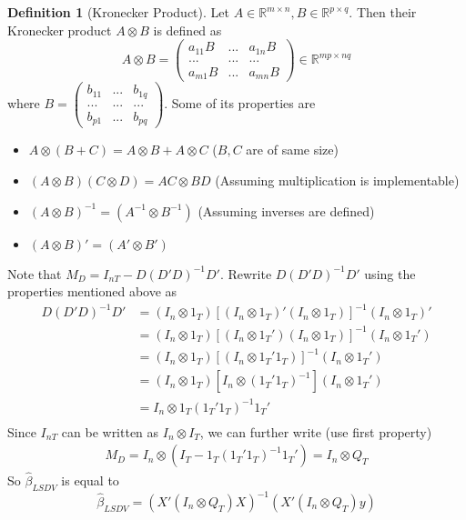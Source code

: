 \documentclass[12pt]{article}
\theoremstyle{definition}
\newtheorem{definition}{Definition}[section]
\theoremstyle{property}
\theoremstyle{assumption}
\theoremstyle{example}
\theoremstyle{comment}
\begin{document}
\begin{mdframed}[backgroundcolor=blue!5] 
\begin{definition}[Kronecker Product] 
Let $A\in\mathbb{R}^{m\times n}, B\in\mathbb{R}^{p\times q}$. Then their Kronecker product $A\otimes B$ is defined as
\[
A\otimes B = \begin{pmatrix}a_{11}B & ... &a_{1n}B\\ ...&...&...\\a_{m1}B &...&a_{mn}B \end{pmatrix}\in\mathbb{R}^{mp\times nq}
\]
where $B=\begin{pmatrix}b_{11} & ... &b_{1q}\\ ...&...&...\\b_{p1} &...&b_{pq} \end{pmatrix}$. Some of its properties are
\begin{itemize}
\item $A\otimes(B+C)=A\otimes B + A\otimes C$ ($B,C$ are of same size)
\item $(A\otimes B)(C\otimes D)=AC\otimes BD$ (Assuming multiplication is implementable)
\item $(A\otimes B)^{-1}= (A^{-1}\otimes B^{-1})$ (Assuming inverses are defined)
\item $(A\otimes B)'= (A'\otimes B')$
\end{itemize}
\end{definition}
\end{mdframed}
Note that $M_D=I_{nT} - D(D'D)^{-1}D'$. Rewrite $D(D'D)^{-1}D'$ using the properties mentioned above as
\[
\begin{aligned}
D(D'D)^{-1}D'&=(I_n\otimes 1_T)[(I_n\otimes 1_T)'(I_n\otimes 1_T)]^{-1}(I_n\otimes 1_T)'\\
&=(I_n\otimes 1_T)[(I_n\otimes 1_T')(I_n\otimes 1_T)]^{-1}(I_n\otimes 1_T')\\
&=(I_n\otimes 1_T)[(I_n\otimes 1_T'1_T)]^{-1}(I_n\otimes 1_T')\\
&=(I_n\otimes 1_T)[I_n\otimes (1_T'1_T)^{-1}](I_n\otimes 1_T')\\
&=I_n\otimes 1_T(1_T'1_T)^{-1}1_T'\\
\end{aligned}
\]
Since $I_{nT}$ can be written as $I_n\otimes I_T$, we can further write (use first property)
\[
\begin{aligned}
M_D=I_n\otimes(I_T - 1_T(1_T'1_T)^{-1}1_T')=I_n\otimes Q_T
\end{aligned}
\]
So $\hat{\beta}_{LSDV}$ is equal to
\[
\hat{\beta}_{LSDV}=({X}'(I_n\otimes Q_T){X})^{-1}({X}'(I_n\otimes Q_T){y})
\]
\end{document}
